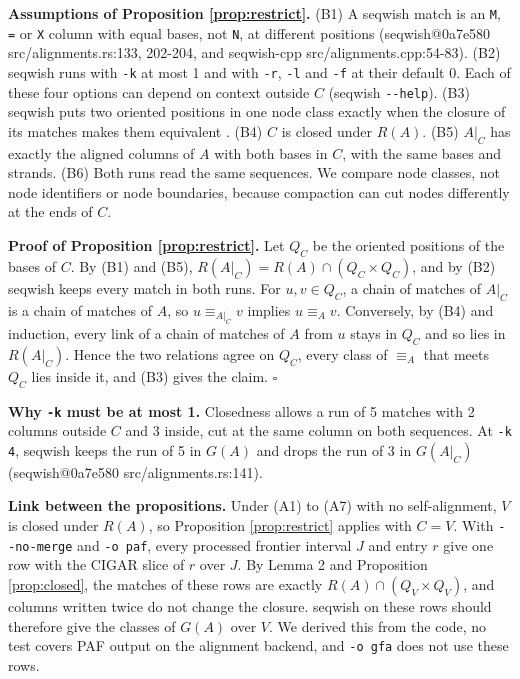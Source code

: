 \textbf{Assumptions of Proposition \ref{prop:restrict}.}
(B1) A seqwish match is an \texttt{M}, \texttt{=} or \texttt{X} column with equal bases, not \texttt{N}, at different positions (seqwish@0a7e580 src/alignments.rs:133, 202-204, and seqwish-cpp src/alignments.cpp:54-83).
(B2) seqwish runs with \texttt{-k} at most 1 and with \texttt{-r}, \texttt{-l} and \texttt{-f} at their default 0.
Each of these four options can depend on context outside $C$ (seqwish \texttt{-{}-help}).
(B3) seqwish puts two oriented positions in one node class exactly when the closure of its matches makes them equivalent \citep{Garrison2023seqwish}.
(B4) $C$ is closed under $R(A)$.
(B5) $A|_C$ has exactly the aligned columns of $A$ with both bases in $C$, with the same bases and strands.
(B6) Both runs read the same sequences.
We compare node classes, not node identifiers or node boundaries, because compaction can cut nodes differently at the ends of $C$.

\textbf{Proof of Proposition \ref{prop:restrict}.}
Let $Q_C$ be the oriented positions of the bases of $C$.
By (B1) and (B5), $R(A|_C)=R(A)\cap(Q_C\times Q_C)$, and by (B2) seqwish keeps every match in both runs.
For $u,v\in Q_C$, a chain of matches of $A|_C$ is a chain of matches of $A$, so $u\equiv_{A|_C}v$ implies $u\equiv_A v$.
Conversely, by (B4) and induction, every link of a chain of matches of $A$ from $u$ stays in $Q_C$ and so lies in $R(A|_C)$.
Hence the two relations agree on $Q_C$, every class of $\equiv_A$ that meets $Q_C$ lies inside it, and (B3) gives the claim.
$\square$

\textbf{Why \texttt{-k} must be at most 1.}
Closedness allows a run of 5 matches with 2 columns outside $C$ and 3 inside, cut at the same column on both sequences.
At \texttt{-k 4}, seqwish keeps the run of 5 in $G(A)$ and drops the run of 3 in $G(A|_C)$ (seqwish@0a7e580 src/alignments.rs:141).

\textbf{Link between the propositions.}
Under (A1) to (A7) with no self-alignment, $V$ is closed under $R(A)$, so Proposition \ref{prop:restrict} applies with $C=V$.
With \texttt{-{}-no-merge} and \texttt{-o paf}, every processed frontier interval $J$ and entry $r$ give one row with the CIGAR slice of $r$ over $J$.
By Lemma 2 and Proposition \ref{prop:closed}, the matches of these rows are exactly $R(A)\cap(Q_V\times Q_V)$, and columns written twice do not change the closure.
seqwish on these rows should therefore give the classes of $G(A)$ over $V$.
We derived this from the code, no test covers PAF output on the alignment backend, and \texttt{-o gfa} does not use these rows.

